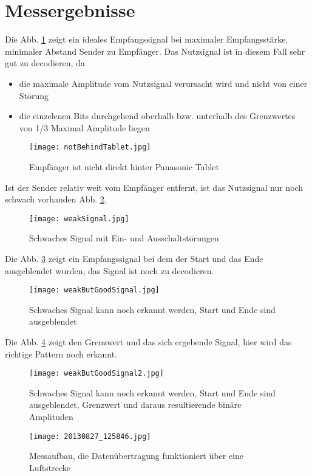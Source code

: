 \documentclass[10pt]{article}
\begin{document}
\clearpage
\newpage


\part{Messergebnisse}
Die Abb. \ref{img:IdealesEmpfangssignal} zeigt ein ideales Empfangssignal bei maximaler Empfangsstärke, minimaler Abstand Sender zu Empfänger. Das Nutzsignal ist in diesem Fall sehr gut zu decodieren, da
\begin{itemize}
\item die maximale Amplitude vom Nutzsignal verursacht wird und nicht von einer Störung 
\item die einzelenen Bits durchgehend oberhalb bzw. unterhalb des Grenzwertes von 1/3 Maximal Amplitude liegen
\end{itemize} 
\begin{figure}[h!]
	\centering
	\texttt{[image: notBehindTablet.jpg]}
	\caption{Empfänger ist nicht direkt hinter Panasonic Tablet}
	\label{img:IdealesEmpfangssignal}
\end{figure}
Ist der Sender relativ weit vom Empfänger entfernt, ist das Nutzsignal nur noch schwach vorhanden Abb. \ref{img:schwachesSignal}.
\begin{figure}[h!]
	\centering
	\texttt{[image: weakSignal.jpg]}
	\caption{Schwaches Signal mit Ein- und Ausschaltstörungen}
	\label{img:schwachesSignal}
\end{figure}
Die Abb. \ref{img:StartEndeCut} zeigt ein Empfangssignal bei dem der Start und das Ende ausgeblendet wurden, das Signal ist noch zu decodieren.
\begin{figure}[h!]
	\centering
	\texttt{[image: weakButGoodSignal.jpg]}
	\caption{Schwaches Signal kann noch erkannt werden, Start und Ende sind ausgeblendet}
	\label{img:StartEndeCut}
\end{figure}
Die Abb. \ref{img:StartEndeCut2} zeigt den Grenzwert und das sich ergebende Signal, hier wird das richtige Pattern noch erkannt.
\begin{figure}[h!]
	\centering
	\texttt{[image: weakButGoodSignal2.jpg]}
	\caption{Schwaches Signal kann noch erkannt werden, Start und Ende sind ausgeblendet, Grenzwert und daraus resultierende binäre Amplituden}
	\label{img:StartEndeCut2}
\end{figure}

\begin{figure}[h!]
	\centering
	\texttt{[image: 20130827\_125846.jpg]}
	\caption{Messaufbau, die Datenübertragung funktioniert über eine Luftstrecke}
	\label{img:Verbindung über Luft}
\end{figure}
\end{document}
